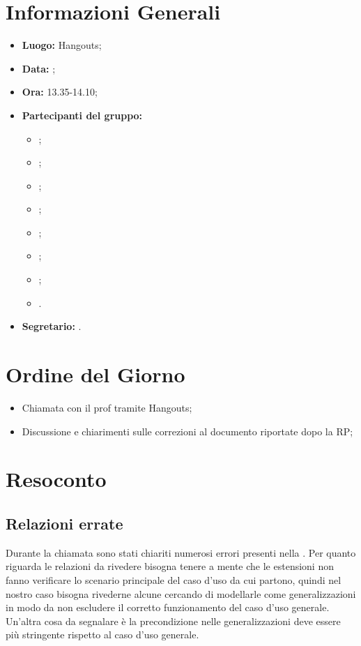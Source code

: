 \section{Informazioni Generali}
\begin{itemize}
\item \textbf{Luogo:} Hangouts;
\item \textbf{Data:} \Data;
\item \textbf{Ora:} 13.35-14.10;
\item \textbf{Partecipanti del gruppo:}
	\begin{itemize}
	\item \AT{}; 
	\item \CE{}; 
	\item \DF{};
	\item \LD{};
	\item \PF{};
	\item \SE{};
	\item \BR{};
	\item \MC{}.
	\end{itemize} 
\item \textbf{Segretario:} \LD{}.
\end{itemize}


\section{Ordine del Giorno}
\begin{itemize}
	\item Chiamata con il prof \CR{} tramite Hangouts;
	\item Discussione e chiarimenti sulle correzioni al documento \AdR{} riportate dopo la RP;
\end{itemize}

\section{Resoconto}
\subsection{Relazioni errate}
Durante la chiamata sono stati chiariti numerosi errori presenti nella \AdR{}.
Per quanto riguarda le relazioni da rivedere bisogna tenere a mente che le estensioni non fanno verificare lo scenario principale del caso 
d'uso da cui partono, quindi nel nostro caso bisogna rivederne alcune cercando di modellarle come generalizzazioni in modo da non escludere il corretto 
funzionamento del caso d'uso generale.\\
Un'altra cosa da segnalare è la precondizione nelle generalizzazioni deve essere più stringente rispetto al caso d'uso generale.\\
